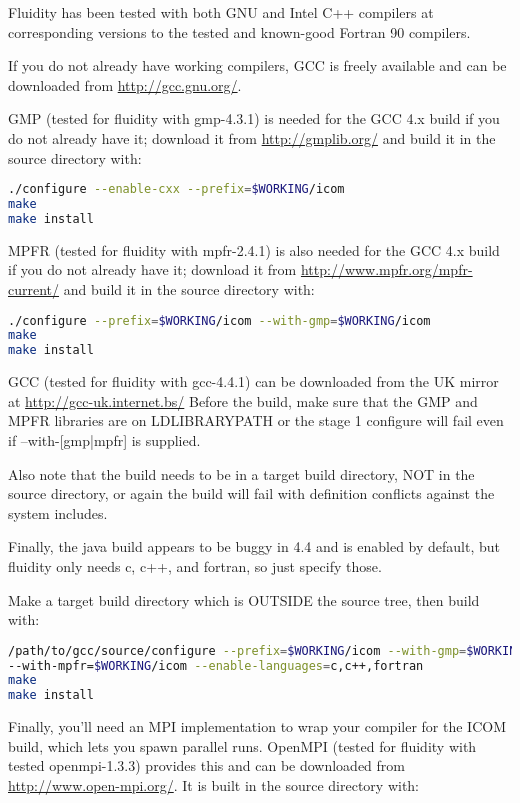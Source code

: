 Fluidity has been tested with both GNU and Intel C++ compilers at corresponding
versions to the tested and known-good Fortran 90 compilers.

If you do not already have working compilers, GCC is freely available and can
be downloaded from \url{http://gcc.gnu.org/}. 

GMP (tested for fluidity with gmp-4.3.1) is needed for the GCC 4.x build if you
do not already have it; download it from \url{http://gmplib.org/} and build it
in the source directory with:

\begin{lstlisting}[language=bash]
./configure --enable-cxx --prefix=$WORKING/icom
make
make install
\end{lstlisting}

MPFR (tested for fluidity with mpfr-2.4.1) is also needed for the GCC 4.x
build if you do not already have it; download it from
\url{http://www.mpfr.org/mpfr-current/} and build it in the source directory
with:

\begin{lstlisting}[language=bash]
./configure --prefix=$WORKING/icom --with-gmp=$WORKING/icom
make
make install
\end{lstlisting}

GCC (tested for fluidity with gcc-4.4.1) can be downloaded from the UK mirror
at \url{http://gcc-uk.internet.bs/} Before the build, make sure that the GMP
and MPFR libraries are on LD{\textunderscore}LIBRARY{\textunderscore}PATH or
the stage 1 configure will fail even if --with-[gmp|mpfr] is supplied.

Also note that the build needs to be in a target build directory, NOT in the
source directory, or again the build will fail with definition conflicts
against the system includes.

Finally, the java build appears to be buggy in 4.4 and is enabled by default,
but fluidity only needs c, c++, and fortran, so just specify those.

Make a target build directory which is OUTSIDE the source tree, then build
with:

\begin{lstlisting}[language=bash]
/path/to/gcc/source/configure --prefix=$WORKING/icom --with-gmp=$WORKING/icom
--with-mpfr=$WORKING/icom --enable-languages=c,c++,fortran
make
make install
\end{lstlisting}

Finally, you'll need an MPI implementation to wrap your compiler for the ICOM build,
which lets you spawn parallel runs. OpenMPI (tested for fluidity with tested
openmpi-1.3.3) provides this and can be downloaded
from \url{http://www.open-mpi.org/}. It is built in the source directory with:

